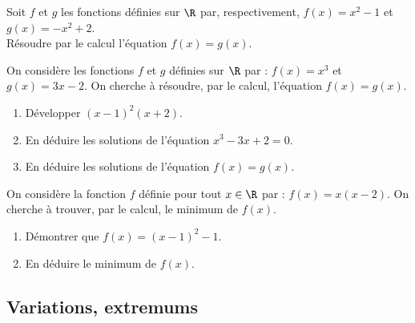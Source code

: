 \begin{multicols}{2}
\begin{exo}
	Soit $f$ et $g$ les fonctions d\'efinies sur $\R$ par, respectivement, $f(x)=x^2-1$ et $g(x)=-x^2+2$. \\ R\'esoudre par le calcul l'\'equation $f(x)=g(x)$.
\end{exo}


\begin{exo}
On consid\`ere les fonctions $f$ et $g$ d\'efinies sur $\R$ par : $f(x)=x^3$ et $g(x)=3x-2$. On cherche \`a r\'esoudre, par le calcul, l'\'equation $f(x)=g(x)$.
		\begin{enumerate}
			\item D\'evelopper $(x-1)^2(x+2)$.
			\item En d\'eduire les solutions de l'\'equation $x^3-3x+2=0$.
			\item En d\'eduire les solutions de l'\'equation $f(x)=g(x)$.
		\end{enumerate}
\end{exo}



%

\begin{exo}
On consid\`ere la fonction $f$ d\'efinie pour tout $x\in\R$ par : $f(x)=x(x-2)$. On cherche \`a trouver, par le calcul, le minimum de $f(x)$.
\begin{enumerate}
	\item D\'emontrer que $f(x)=(x-1)^2-1$.
	\item En d\'eduire le minimum de $f(x)$.
\end{enumerate}%
\end{exo}

\end{multicols}

\sautpage


\subsection{Variations, extremums}

